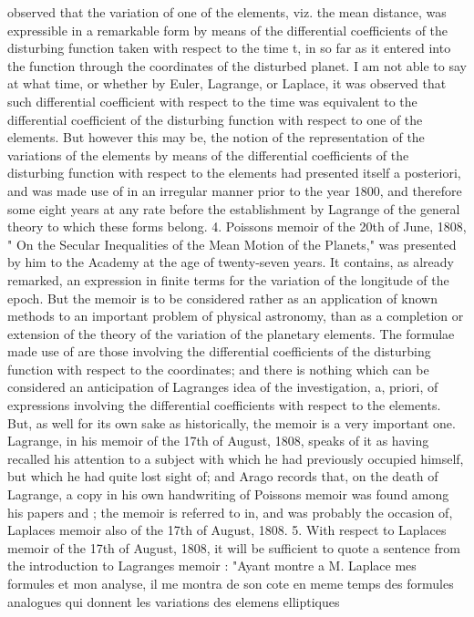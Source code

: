 \documentclass[12pt,a4paper]{article}
\theoremstyle{definition}
\begin{document}
observed that the variation of one of the elements, viz. the mean distance, was
expressible in a remarkable form by means of the differential coefficients of the
disturbing function taken with respect to the time t, in so far as it entered into the
function through the coordinates of the disturbed planet. I am not able to say at what
time, or whether by Euler, Lagrange, or Laplace, it was observed that such differential
coefficient with respect to the time was equivalent to the differential coefficient of the
disturbing function with respect to one of the elements. But however this may be,
the notion of the representation of the variations of the elements by means of the
differential coefficients of the disturbing function with respect to the elements had
presented itself a posteriori, and was made use of in an irregular manner prior to
the year 1800, and therefore some eight years at any rate before the establishment
by Lagrange of the general theory to which these forms belong.
4. Poissons memoir of the 20th of June, 1808, " On the Secular Inequalities of
the Mean Motion of the Planets," was presented by him to the Academy at the age
of twenty-seven years. It contains, as already remarked, an expression in finite terms
for the variation of the longitude of the epoch. But the memoir is to be considered
rather as an application of known methods to an important problem of physical
astronomy, than as a completion or extension of the theory of the variation of the
planetary elements. The formulae made use of are those involving the differential
coefficients of the disturbing function with respect to the coordinates; and there is
nothing which can be considered an anticipation of Lagranges idea of the investigation,
a, priori, of expressions involving the differential coefficients with respect to the
elements. But, as well for its own sake as historically, the memoir is a very important
one. Lagrange, in his memoir of the 17th of August, 1808, speaks of it as having
recalled his attention to a subject with which he had previously occupied himself, but
which he had quite lost sight of; and Arago records that, on the death of Lagrange,
a copy in his own handwriting of Poissons memoir was found among his papers and
;
the memoir is referred to in, and was probably the occasion of, Laplaces memoir also
of the 17th of August, 1808.
5. With respect to Laplaces memoir of the 17th of August, 1808, it will be
sufficient to quote a sentence from the introduction to Lagranges memoir : "Ayant
montre a M. Laplace mes formules et mon analyse, il me montra de son cote en
meme temps des formules analogues qui donnent les variations des elemens elliptiques
\end{document}
